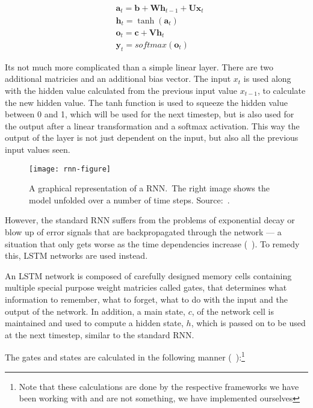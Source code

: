 \begin{align*}
    & \textbf{a}_t = \textbf{b} + \textbf{W} \textbf{h}_{t-1} + \textbf{U} \textbf{x}_t \\
    & \textbf{h}_t = \tanh(\textbf{a}_t) \\
    & \textbf{o}_t = \textbf{c} + \textbf{V} \textbf{h}_t \\
    & \textbf{y}_t = softmax(\textbf{o}_t)
\end{align*}

Its not much more complicated than a simple linear layer. There are two
additional matricies and an additional bias vector. The input $x_t$ is used
along with the hidden value calculated from the previous input value $x_{t-1}$,
to calculate the new hidden value. The tanh function is used to squeeze the
hidden value between 0 and 1, which will be used for the next timestep, but is
also used for the output after a linear transformation and a softmax activation.
This way the output of the layer is not just dependent on the input, but also
all the previous input values seen.

\begin{figure}[h]
    \texttt{[image: rnn-figure]}
    \caption{A graphical representation of a RNN.\ The right image shows the
    model unfolded over a number of time steps. Source:~\cite{olah2015lstm}.
    }\label{fig:rnn}
\end{figure}

However, the standard RNN suffers from the problems of exponential decay or blow
up of error signals that are backpropagated through the network --- a situation
that only gets worse as the time dependencies increase
(~\cite{hochreiter2001gradient}). To remedy this, LSTM networks are used instead.

An LSTM network is composed of carefully designed memory cells containing
multiple special purpose weight matricies called gates, that determines what
information to remember, what to forget, what to do with the input and the
output of the network. In addition, a main state, $c$, of the network cell is
maintained and used to compute a hidden state, $h$, which is passed on to be
used at the next timestep, similar to the standard RNN.

The gates and states are calculated in the following manner
(~\cite{huang2015bidirectional}):\footnote{Note that
    these calculations are done by the respective frameworks we have been
working with and are not something, we have implemented ourselves}


